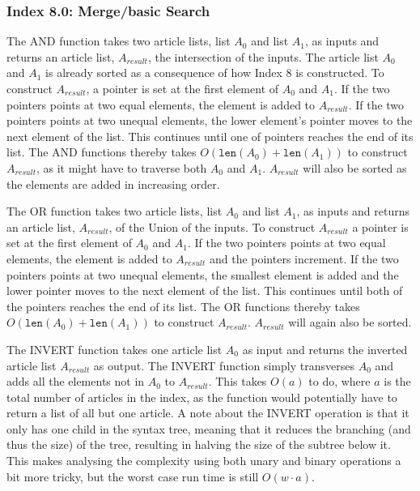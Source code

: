 \subsubsection{Index 8.0: Merge/basic Search}
The AND function takes two article lists, list $A_0$ and list $A_1$, as inputs and returns an article list, $A_{result}$, the intersection of the inputs. The article list $A_0$ and $A_1$ is already sorted as a consequence of how Index 8 is constructed. To construct $A_{result}$, a pointer is set at the first element of $A_0$ and $A_1$. If the two pointers points at two equal elements, the element is added to $A_{result}$. If the two pointers points at two unequal elements, the lower element's pointer moves to the next element of the list. This continues until one of pointers reaches the end of its list. The AND functions thereby takes $O(\texttt{len}(A_0) + \texttt{len}(A_1))$ to construct $A_{result}$, as it might have to traverse both $A_0$ and $A_1$. $A_{result}$ will also be sorted as the elements are added in increasing order.

The OR function takes two article lists, list $A_0$ and list $A_1$, as inputs and returns an article list, $A_{result}$, of the Union of the inputs. To construct $A_{result}$ a pointer is set at the first element of $A_0$ and $A_1$. If the two pointers points at two equal elements, the element is added to $A_{result}$ and the pointers increment. If the two pointers points at two unequal elements, the smallest element is added and the lower pointer moves to the next element of the list. This continues until both of the pointers reaches the end of its list. The OR functions thereby takes $O(\texttt{len}(A_0) + \texttt{len}(A_1))$ to construct $A_{result}$. $A_{result}$ will again also be sorted.

The INVERT function takes one article list $A_0$ as input and returns the inverted article list $A_{result}$ as output. The INVERT function simply transverses $A_0$ and adds all the elements not in $A_0$ to $A_{result}$.
This takes $O(a)$ to do, where $a$ is the total number of articles in the index, as the function would potentially have to return a list of all but one article. A note about the INVERT operation is that it only has one child in the syntax tree, meaning that it reduces the branching (and thus the size) of the tree, resulting in halving the size of the subtree below it. This makes analysing the complexity using both unary and binary operations a bit more tricky, but the worst case run time is still $O(w\cdot a)$. 



